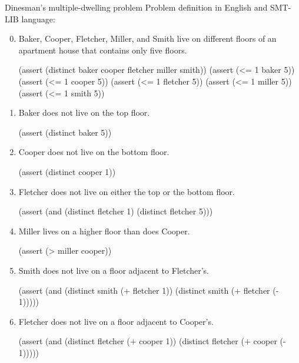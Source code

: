 \documentclass{beamer}
\begin{document}
\begin{frame}[fragile,t]
\begin{columns}[t,onlytextwidth]
\begin{column}{0.485\textwidth}
		\begin{block}{Dinesman's multiple-dwelling problem} %
			Problem definition in English and SMT-LIB language:
			\begin{enumerate}
				\setcounter{enumi}{-1} %
				
				\item Baker, Cooper, Fletcher, Miller, and Smith live on different floors of an apartment house that contains only five floors.
				\begin{smtlib}
					(assert (distinct baker cooper fletcher miller smith))
					(assert (<= 1 baker 5))
					(assert (<= 1 cooper 5))
					(assert (<= 1 fletcher 5))
					(assert (<= 1 miller 5))
					(assert (<= 1 smith 5))
				\end{smtlib}
				
				\item Baker does not live on the top floor.
				\begin{smtlib}
					(assert (distinct baker 5))
				\end{smtlib}
			
				\item Cooper does not live on the bottom floor.
				\begin{smtlib}
					(assert (distinct cooper 1))
				\end{smtlib}
				
				\item Fletcher does not live on either the top or the bottom floor.
				\begin{smtlib}
					(assert (and (distinct fletcher 1)
					             (distinct fletcher 5)))
				\end{smtlib}
			
				\item Miller lives on a higher floor than does Cooper.
				\begin{smtlib}
					(assert (> miller cooper))
				\end{smtlib}
			
				\item Smith does not live on a floor adjacent to Fletcher's.
				\begin{smtlib}
					(assert (and (distinct smith (+ fletcher 1))
					             (distinct smith (+ fletcher (- 1)))))
				\end{smtlib}
			
				\item Fletcher does not live on a floor adjacent to Cooper's.
				\begin{smtlib}
					(assert (and (distinct fletcher (+ cooper 1))
					             (distinct fletcher (+ cooper (- 1)))))
				\end{smtlib}
			\end{enumerate}
		

\end{block}
\end{column}
\end{columns}
\end{frame}
\end{document}
